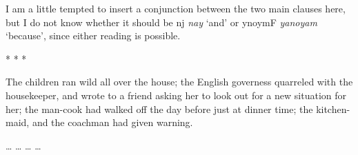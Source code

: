 \documentclass[12pt,paper=letter]{scrartcl}
\newcommand{\fw}[1]{\textit{#1}} %
\newcommand{\qq}[1]{\enquote*{#1}} %
\newcommand{\divider}{\vspace{0.5\baselineskip} \centerline{* * *} \vspace{0.5\baselineskip}}
\newcommand{\ayr}[1]{{\Tagati #1}}
\begin{document}
I am a little tempted to insert a conjunction between the two main clauses here,
but I do not know whether it should be \ayr{nj} \fw{nay} \qq{and} or \ayr{ynoymF}
\fw{yanoyam} \qq{because}, since either reading is possible.

\divider

The children ran wild all over the house; the English governess quarreled with the housekeeper, and wrote to a friend asking her to look out for a new situation for her; the man-cook had walked off the day before just at dinner time; the kitchen-maid, and the coachman had given warning.

\begin{exe}
    \ex
    \begin{xlist}
	\ex …
	\ex …
	\ex …
	\ex …
    \end{xlist}
\end{exe}


\printbibliography
\end{document}
